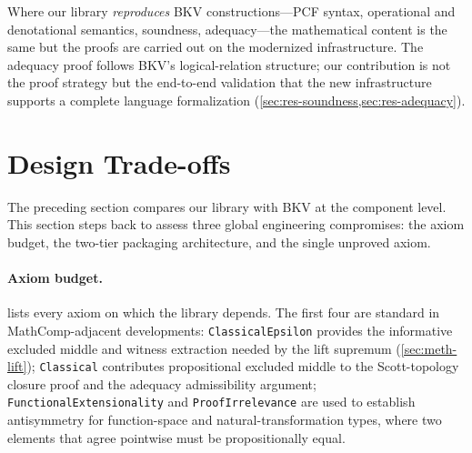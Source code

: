 \noindent
Where our library \emph{reproduces} BKV constructions---PCF syntax,
operational and denotational semantics, soundness, adequacy---the
mathematical content is the same but the proofs are carried out on the
modernized \HB{} infrastructure.
The adequacy proof follows BKV's logical-relation structure; our
contribution is not the proof strategy but the end-to-end validation
that the new infrastructure supports a complete language formalization
(\cref{sec:res-soundness,sec:res-adequacy}).

\section{Design Trade-offs}
\label{sec:disc-tradeoffs}

The preceding section compares our library with BKV at the component
level.  This section steps back to assess three global engineering
compromises: the axiom budget, the two-tier packaging architecture, and
the single unproved axiom.

\paragraph{Axiom budget.}
 lists every axiom on which the library depends.
The first four are standard in MathComp-adjacent \Rocq{} developments:
\texttt{ClassicalEpsilon} provides the informative excluded middle and
witness extraction needed by the lift supremum
(\cref{sec:meth-lift}); \texttt{Classical} contributes propositional
excluded middle to the Scott-topology closure proof and the adequacy
admissibility argument; \texttt{FunctionalExtensionality} and
\texttt{ProofIrrelevance} are used to establish antisymmetry for
function-space and natural-transformation types, where two elements
that agree pointwise must be propositionally equal.


